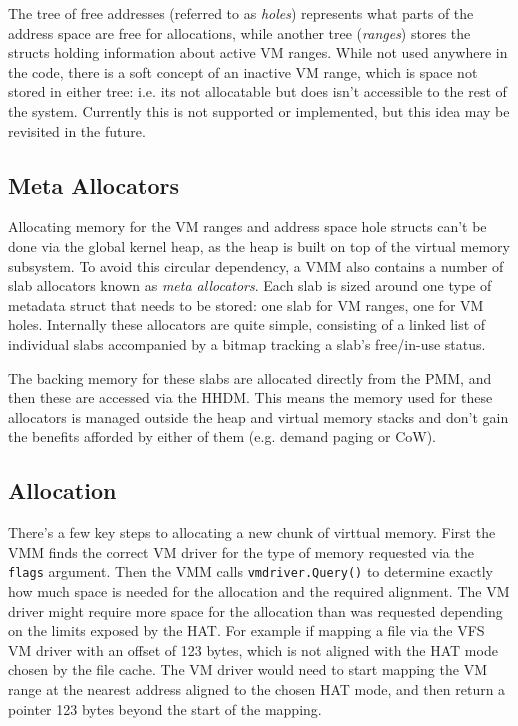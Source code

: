 The tree of free addresses (referred to as \textit{holes}) represents what parts of the address space are free for allocations, while another tree (\textit{ranges}) stores the structs holding information about active VM ranges. While not used anywhere in the code, there is a soft concept of an inactive VM range, which is space not stored in either tree: i.e. its not allocatable but does isn't accessible to the rest of the system. Currently this is not supported or implemented, but this idea may be revisited in the future.

\subsection{Meta Allocators}
Allocating memory for the VM ranges and address space hole structs can't be done via the global kernel heap, as the heap is built on top of the virtual memory subsystem. To avoid this circular dependency, a VMM also contains a number of slab allocators known as \textit{meta allocators}. Each slab is sized around one type of metadata struct that needs to be stored: one slab for VM ranges, one for VM holes. Internally these allocators are quite simple, consisting of a linked list of individual slabs accompanied by a bitmap tracking a slab's free/in-use status.

The backing memory for these slabs are allocated directly from the PMM, and then these are accessed via the HHDM. This means the memory used for these allocators is managed outside the heap and virtual memory stacks and don't gain the benefits afforded by either of them (e.g. demand paging or CoW).

\subsection{Allocation}
There's a few key steps to allocating a new chunk of virttual memory. First the VMM finds the correct VM driver for the type of memory requested via the \verb|flags| argument. Then the VMM calls \verb|vmdriver.Query()| to determine exactly how much space is needed for the allocation and the required alignment. The VM driver might require more space for the allocation than was requested depending on the limits exposed by the HAT. For example if mapping a file via the VFS VM driver with an offset of 123 bytes, which is not aligned with the HAT mode chosen by the file cache. The VM driver would need to start mapping the VM range at the nearest address aligned to the chosen HAT mode, and then return a pointer 123 bytes beyond the start of the mapping.

